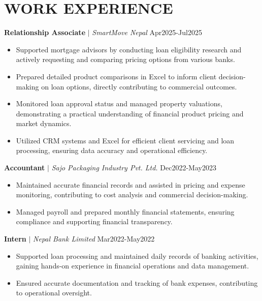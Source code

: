 \documentclass[10pt, letterpaper]{article}
\begin{document}
\section{WORK EXPERIENCE}
\noindent\textbf{Relationship Associate} $|$ \textit{SmartMove Nepal} \hfill Apr2025-Jul2025
\begin{itemize}[leftmargin=0.15in, topsep=0pt, partopsep=0pt, itemsep=-2pt]
    \item Supported mortgage advisors by conducting loan eligibility research and actively requesting and comparing pricing options from various banks.
    \item Prepared detailed product comparisons in Excel to inform client decision-making on loan options, directly contributing to commercial outcomes.
    \item Monitored loan approval status and managed property valuations, demonstrating a practical understanding of financial product pricing and market dynamics.
    \item Utilized CRM systems and Excel for efficient client servicing and loan processing, ensuring data accuracy and operational efficiency.
\end{itemize}
\vspace{4pt}

\noindent\textbf{Accountant} $|$ \textit{Sajo Packaging Industry Pvt. Ltd.} \hfill Dec2022-May2023
\begin{itemize}[leftmargin=0.15in, topsep=0pt, partopsep=0pt, itemsep=-2pt]
    \item Maintained accurate financial records and assisted in pricing and expense monitoring, contributing to cost analysis and commercial decision-making.
    \item Managed payroll and prepared monthly financial statements, ensuring compliance and supporting financial transparency.
\end{itemize}
\vspace{4pt}

\noindent\textbf{Intern} $|$ \textit{Nepal Bank Limited} \hfill Mar2022-May2022
\begin{itemize}[leftmargin=0.15in, topsep=0pt, partopsep=0pt, itemsep=-2pt]
    \item Supported loan processing and maintained daily records of banking activities, gaining hands-on experience in financial operations and data management.
    \item Ensured accurate documentation and tracking of bank expenses, contributing to operational oversight.
\end{itemize}
\vspace{4pt}
\end{document}
